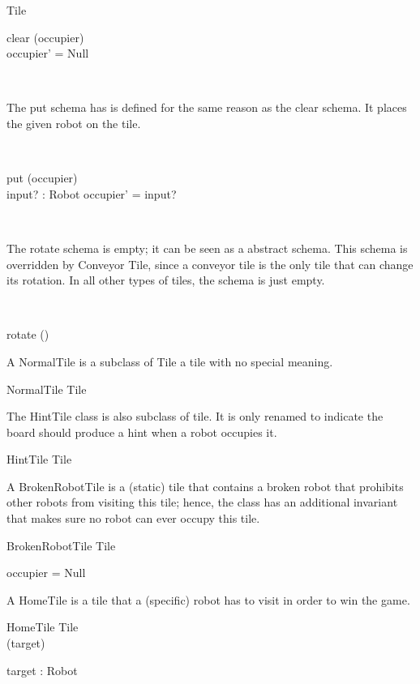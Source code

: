 \documentclass[12pt]{article}
\begin{document}
\begin{class}{Tile}
\begin{schema}{clear}
\Delta (occupier) \\
\where
occupier' = Null
\end{schema} \\
\begin{zpar}
The put schema has is defined for the same reason as the clear schema. It places the given robot on the tile.
\end{zpar}\\
\begin{schema}{put}
\Delta (occupier) \\
input? : Robot
\where
occupier' = input?
\end{schema} \\
\begin{zpar}
The rotate schema is empty; it can be seen as a abstract schema. This schema is overridden by Conveyor Tile, since a conveyor tile is the only tile that can change its rotation. In all other types of tiles, the schema is just empty.
\end{zpar} \\
\begin{schema}{rotate}
\Delta()
\end{schema}
\end{class}

A NormalTile is a subclass of Tile  a tile with no special meaning.
\begin{class}{NormalTile}
Tile
\end{class}

The HintTile class is also subclass of tile. It is only renamed to indicate the board should produce a hint when a robot occupies it.
\begin{class}{HintTile}
Tile
\end{class}

A BrokenRobotTile is a (static) tile that contains a broken robot that prohibits other robots from visiting this tile; hence, the class has an additional invariant that makes sure no robot can ever occupy this tile.
\begin{class}{BrokenRobotTile}
Tile \\
\begin{state}
occupier = Null
\end{state}
\end{class}

A HomeTile is a tile that a (specific) robot has to visit in order to win the game. 
\begin{class}{HomeTile}
Tile \\
\upharpoonright (target) \\
\begin{state}
target : Robot
\end{state}
\end{class}
\end{document}
